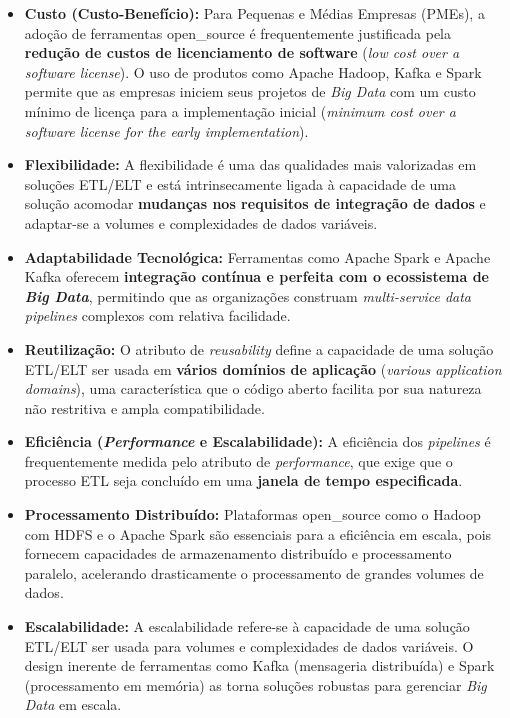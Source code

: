 \begin{itemize}
    \item \textbf{Custo (Custo-Benefício):} Para Pequenas e Médias Empresas (PMEs), a adoção de ferramentas \acs{open_source} é frequentemente justificada pela \textbf{redução de custos de licenciamento de software} (\textit{low cost over a software license}). O uso de produtos como Apache Hadoop, Kafka e Spark permite que as empresas iniciem seus projetos de \textit{Big Data} com um custo mínimo de licença para a implementação inicial (\textit{minimum cost over a software license for the early implementation}).
    
    \item \textbf{Flexibilidade:} A flexibilidade é uma das qualidades mais valorizadas em soluções ETL/ELT e está intrinsecamente ligada à capacidade de uma solução acomodar \textbf{mudanças nos requisitos de integração de dados} e adaptar-se a volumes e complexidades de dados variáveis.
    
    \item \textbf{Adaptabilidade Tecnológica:} Ferramentas como Apache Spark e Apache Kafka oferecem \textbf{integração contínua e perfeita com o ecossistema de \textit{Big Data}}, permitindo que as organizações construam \textit{multi-service data pipelines} complexos com relativa facilidade.
    
    \item \textbf{Reutilização:} O atributo de \textit{reusability} define a capacidade de uma solução ETL/ELT ser usada em \textbf{vários domínios de aplicação} (\textit{various application domains}), uma característica que o código aberto facilita por sua natureza não restritiva e ampla compatibilidade.
    
    \item \textbf{Eficiência (\textit{Performance} e Escalabilidade):} A eficiência dos \textit{pipelines} é frequentemente medida pelo atributo de \textit{performance}, que exige que o processo ETL seja concluído em uma \textbf{janela de tempo especificada}.
    
    \item \textbf{Processamento Distribuído:} Plataformas \acs{open_source} como o Hadoop com HDFS e o Apache Spark são essenciais para a eficiência em escala, pois fornecem capacidades de armazenamento distribuído e processamento paralelo, acelerando drasticamente o processamento de grandes volumes de dados.
    
    \item \textbf{Escalabilidade:} A escalabilidade refere-se à capacidade de uma solução ETL/ELT ser usada para volumes e complexidades de dados variáveis. O design inerente de ferramentas como Kafka (mensageria distribuída) e Spark (processamento em memória) as torna soluções robustas para gerenciar \textit{Big Data} em escala.
\end{itemize}

